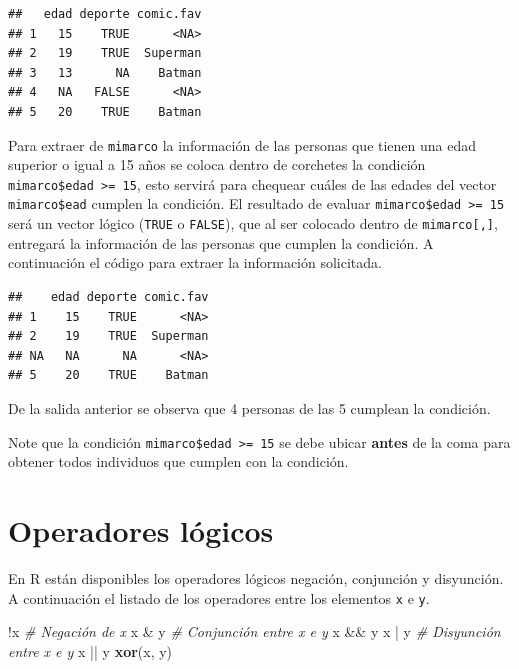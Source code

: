 \documentclass[10pt,]{krantz}
\makeatletter
\newenvironment{Shaded}{\begin{snugshade}}{\end{snugshade}}
\newcommand{\KeywordTok}[1]{\textcolor[rgb]{0.13,0.29,0.53}{\textbf{{#1}}}}
\newcommand{\DecValTok}[1]{\textcolor[rgb]{0.00,0.00,0.81}{{#1}}}
\newcommand{\StringTok}[1]{\textcolor[rgb]{0.31,0.60,0.02}{{#1}}}
\newcommand{\CommentTok}[1]{\textcolor[rgb]{0.56,0.35,0.01}{\textit{{#1}}}}
\newcommand{\NormalTok}[1]{{#1}}
\let\proglang=\textsf
\newenvironment{kframe}{%
\medskip{}
\setlength{\fboxsep}{.8em}
 \def\at@end@of@kframe{}%
 \ifinner\ifhmode%
  \def\at@end@of@kframe{\end{minipage}}%
  \begin{minipage}{\columnwidth}%
 \fi\fi%
 \def\FrameCommand##1{\hskip\@totalleftmargin \hskip-\fboxsep
 \colorbox{shadecolor}{##1}\hskip-\fboxsep
     \hskip-\linewidth \hskip-\@totalleftmargin \hskip\columnwidth}%
 \MakeFramed {\advance\hsize-\width
   \@totalleftmargin\z@ \linewidth\hsize
   \@setminipage}}%
 {\par\unskip\endMakeFramed%
 \at@end@of@kframe}
\renewenvironment{Shaded}{\begin{kframe}}{\end{kframe}}
\let\BeginKnitrBlock\begin \let\EndKnitrBlock\end
\makeatother
\begin{document}
\begin{verbatim}
##   edad deporte comic.fav
## 1   15    TRUE      <NA>
## 2   19    TRUE  Superman
## 3   13      NA    Batman
## 4   NA   FALSE      <NA>
## 5   20    TRUE    Batman
\end{verbatim}

Para extraer de \texttt{mimarco} la información de las personas que
tienen una edad superior o igual a 15 años se coloca dentro de corchetes
la condición \texttt{mimarco\$edad\ \textgreater{}=\ 15}, esto servirá
para chequear cuáles de las edades del vector \texttt{mimarco\$ead}
cumplen la condición. El resultado de evaluar
\texttt{mimarco\$edad\ \textgreater{}=\ 15} será un vector lógico
(\texttt{TRUE} o \texttt{FALSE}), que al ser colocado dentro de
\texttt{mimarco{[},{]}}, entregará la información de las personas que
cumplen la condición. A continuación el código para extraer la
información solicitada.

\begin{Shaded}
\end{Shaded}

\begin{verbatim}
##    edad deporte comic.fav
## 1    15    TRUE      <NA>
## 2    19    TRUE  Superman
## NA   NA      NA      <NA>
## 5    20    TRUE    Batman
\end{verbatim}

De la salida anterior se observa que 4 personas de las 5 cumplean la
condición.

\BeginKnitrBlock{rmdwarning}
Note que la condición \texttt{mimarco\$edad\ \textgreater{}=\ 15} se
debe ubicar \textbf{antes} de la coma para obtener todos individuos que
cumplen con la condición.
\EndKnitrBlock{rmdwarning}

\section{\texorpdfstring{Operadores lógicos
}{Operadores lógicos }}\label{operadores-logicos}

En \proglang{R} están disponibles los operadores lógicos negación,
conjunción y disyunción. A continuación el listado de los operadores
entre los elementos \texttt{x} e \texttt{y}.

\begin{Shaded}
\begin{Highlighting}[]
\NormalTok{!x  }\CommentTok{# Negación de x}
\NormalTok{x &}\StringTok{ }\NormalTok{y  }\CommentTok{# Conjunción entre x e y}
\NormalTok{x &&}\StringTok{ }\NormalTok{y}
\NormalTok{x |}\StringTok{ }\NormalTok{y  }\CommentTok{# Disyunción entre x e y}
\NormalTok{x ||}\StringTok{ }\NormalTok{y}
\KeywordTok{xor}\NormalTok{(x, y)}
\end{Highlighting}
\end{Shaded}
\end{document}

